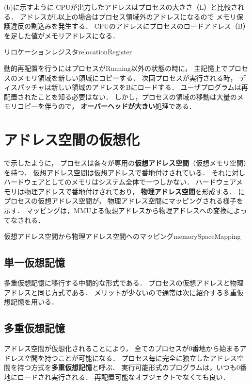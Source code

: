 (b)に示すように
CPUが出力したアドレスはプロセスの大きさ（L）と比較される．
アドレスがL以上の場合はプロセス領域外のアドレスになるので
メモリ保護違反の割込みを発生する．
CPUのアドレスにプロセスのロードアドレス（B）を足した値がメモリアドレスになる．

{リロケーションレジスタ}{relocationRegister}

動的再配置を行うにはプロセスがRunning以外の状態の時に，
主記憶上でプロセスのメモリ領域を新しい領域にコピーする．
次回プロセスが実行される時，
ディスパッチャは新しい領域のアドレスをBにロードする．
ユーザプログラムは再配置されたことを知る必要はない．
しかし，プロセスの領域の移動は大量のメモリコピーを伴うので，
{\bf オーバーヘッドが大きい}処理である．

\section{アドレス空間の仮想化}
で示したように，
プロセスは各々が専用の{\bf 仮想アドレス空間}（仮想メモリ空間）を持つ．
仮想アドレス空間は仮想アドレスで番地付けされている．
それに対しハードウェアとしてのメモリはシステム全体で一つしかない．
ハードウェアメモリは物理アドレスで番地付けされており，
{\bf 物理アドレス空間}を形成する．
にプロセスの仮想アドレス空間が，
物理アドレス空間にマッピングされる様子を示す．
マッピングは，MMUよる仮想アドレスから物理アドレスへの変換によってなされる．

{仮想アドレス空間から物理アドレス空間へのマッピング}{memorySpaceMapping}

\subsection{単一仮想記憶}
多重仮想記憶に移行する中間的な形式である．
プロセスの仮想アドレスと物理アドレスと同じ方式である．
メリットが少ないので通常は次に紹介する多重仮想記憶を用いる．

\subsection{多重仮想記憶}
アドレス空間が仮想化されることにより，
全てのプロセスが0番地から始まるアドレス空間を持つことが可能になる．
プロセス毎に完全に独立したアドレス空間を持つ方式を{\bf 多重仮想記憶}と呼ぶ．
実行可能形式のプログラムは，いつも0番地にロードされ実行される．
再配置可能なオブジェクトでなくても良い．

